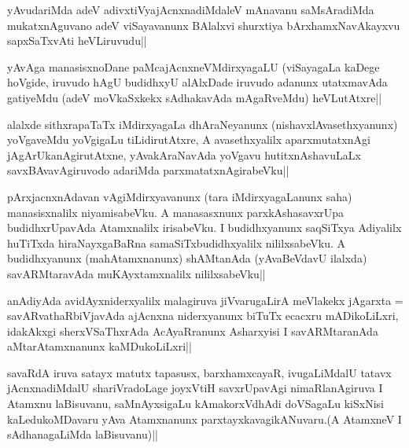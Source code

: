 \begin{artha}
yAvudariMda adeV adivxtiVyajAcnxnadiMdaleV mAnavanu saMsAradiMda mukatxnAguvano adeV viSayavanunx BAlalxvi shurxtiya bArxhamxNavAkayxvu sapxSaTxvAti heVLiruvudu||
\end{artha}


\begin{artha}
yAvAga manasisxnoDane paMcajAcnxneVMdirxyagaLU (viSayagaLa kaDege hoVgide, iruvudo hAgU budidhxyU alAlxDade iruvudo adanunx utatxmavAda gatiyeMdu (adeV moVkaSxkekx sAdhakavAda mAgaRveMdu) heVLutAtxre||
\end{artha}

\begin{artha}
alalxde sithxrapaTaTx iMdirxyagaLa dhAraNeyanunx (nishavxlAvasethxyanunx) yoVgaveMdu yoVgigaLu tiLidirutAtxre, A avasethxyalilx aparxmutatxnAgi jAgArUkanAgirutAtxne, yAvakAraNavAda yoVgavu hutitxnAshavuLaLx savxBAvavAgiruvodo adariMda parxmatatxnAgirabeVku||
\end{artha}

\begin{artha}
pArxjacnxnAdavan vAgiMdirxyavanunx (tara iMdirxyagaLanunx saha) manasisxnalilx niyamisabeVku. A manasasxnunx parxkAshasavxrUpa budidhxrUpavAda Atamxnalilx irisabeVku. I budidhxyanunx saqSiTxya Adiyalilx huTiTxda hiraNayxgaBaRna samaSiTxbudidhxyalilx nililxsabeVku. A budidhxyanunx (mahAtamxnanunx) shAMtanAda (yAvaBeVdavU ilalxda) savARMtaravAda muKAyxtamxnalilx nililxsabeVku||
\end{artha}


\begin{artha}
anAdiyAda avidAyxniderxyalilx malagiruva jiVvarugaLirA meVlakekx jAgarxta = savARvathaRbiVjavAda ajAcnxna niderxyanunx biTuTx ecacxru mADikoLiLxri, idakAkxgi sherxVSaThxrAda AcAyaRranunx Asharxyisi I savARMtaranAda aMtarAtamxnanunx kaMDukoLiLxri||
\end{artha}


\begin{artha}
savaRdA iruva satayx matutx tapasusx, barxhamxcayaR, ivugaLiMdalU tatavx jAcnxnadiMdalU shariVradoLage joyxVtiH savxrUpavAgi nimaRlanAgiruva I Atamxnu laBisuvanu, saMnAyxsigaLu kAmakorxVdhAdi doVSagaLu kiSxNisi kaLedukoMDavaru yAva Atamxnanunx parxtayxkavagikANuvaru.(A AtamxneV I sAdhanagaLiMda laBisuvanu)||
\end{artha}

